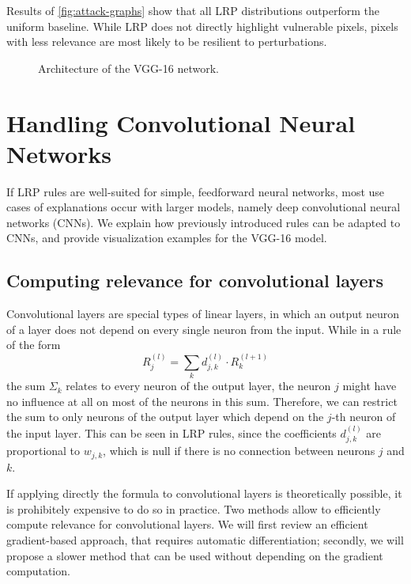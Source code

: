 \documentclass[twocolumn]{../cs-classes/cs-classes}
\newcommand*{\1}{\digitsbb{1}}
\newcommand*{\0}{\digitsbb{0}}
\begin{document}
Results of \autoref{fig:attack-graphs} show that all LRP distributions outperform the uniform baseline. While LRP does not directly highlight vulnerable pixels, pixels with less relevance are most likely to be resilient to perturbations.


\begin{figure}
    \centering
    
    \caption{Architecture of the VGG-16 network.}
    \label{fig:vgg-architecture}
\end{figure}
\section{Handling Convolutional Neural Networks}
If LRP rules are well-suited for simple, feedforward neural networks, most use cases of explanations occur with larger models, namely deep convolutional neural networks (CNNs). We explain how previously introduced rules can be adapted to CNNs, and provide visualization examples for the VGG-16 model.

\subsection{Computing relevance for convolutional layers}
Convolutional layers are special types of linear layers, in which an output neuron of a layer does not depend on every single neuron from the input. While in a rule of the form
\begin{equation*}
    R_j^{(l)} = \sum_k d_{j, k}^{(l)} \cdot R_k^{(l+1)}
\end{equation*}
the sum $\Sigma_k$ relates to every neuron of the output layer, the neuron $j$ might have no influence at all on most of the neurons in this sum. Therefore, we can restrict the sum to only neurons of the output layer which depend on the $j$-th neuron of the input layer. This can be seen in LRP rules, since the coefficients $d_{j, k}^{(l)}$ are proportional to $w_{j,k}$, which is null if there is no connection between neurons $j$ and $k$. 

If applying directly the formula to convolutional layers is theoretically possible, it is prohibitely expensive to do so in practice. Two methods allow to efficiently compute relevance for convolutional layers. We will first review an efficient gradient-based approach, that requires automatic differentiation; secondly, we will propose a slower method that can be used without depending on the gradient computation.
\end{document}
